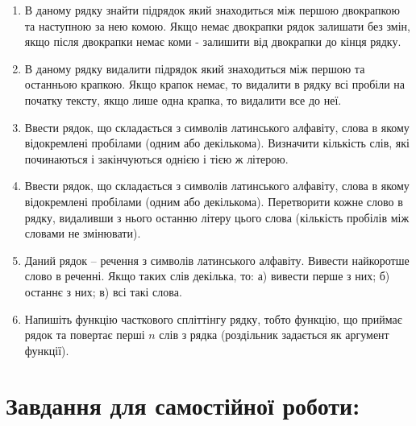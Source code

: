 \documentclass[a5paper,titlepage,openany,twoside,
]
{book_unv}%
\begin{document}
\begin{enumerate}
\def\labelenumi{\arabic{enumi})}
\item
  В даному рядку знайти підрядок який знаходиться між першою 
двокрапкою та наступною за нею комою. Якщо немає двокрапки
рядок залишати без змін, якщо після двокрапки немає коми - залишити від
двокрапки до кінця рядку.
\item
  В даному рядку видалити підрядок який знаходиться між першою 
та останньою крапкою. Якщо крапок немає, то видалити в рядку всі пробіли
на початку тексту, якщо лише одна крапка, то видалити все до неї.
\item
  Ввести рядок, що складається з символів латинського алфавіту, слова в якому
  відокремлені пробілами (одним або декількома). Визначити кількість слів,
  які починаються і закінчуються однією і тією ж літерою.
\item
  Ввести рядок, що складається з символів латинського алфавіту, слова в якому
  відокремлені пробілами (одним або декількома). Перетворити кожне слово в
  рядку, видаливши з нього останню літеру цього 
  слова (кількість пробілів між словами не змінювати).
\item
  Даний рядок -- речення з символів латинського алфавіту. Вивести
  найкоротше слово в реченні. Якщо таких слів декілька, то: 
  а) вивести перше з них; б) останнє з них; в) всі такі слова.
\item
  Напишіть функцію часткового спліттінгу рядку, тобто функцію, що
  приймає рядок та повертає перші $n$ слів з рядка (роздільник задається
  як аргумент функції).
\end{enumerate}

\section{Завдання для самостійної роботи:}
\end{document}
